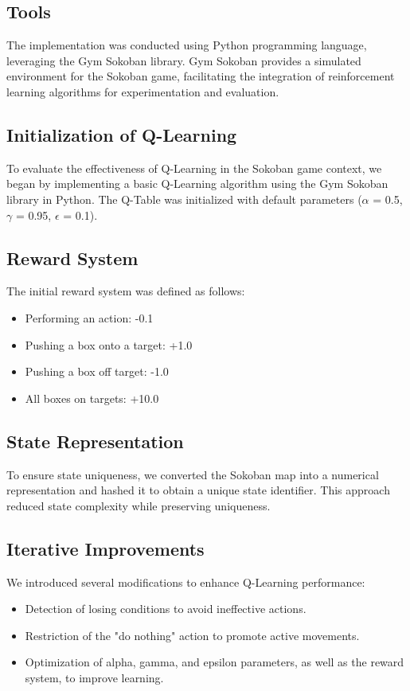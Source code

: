 \documentclass[10pt,twocolumn]{article}
\begin{document}
\subsection{Tools}

The implementation was conducted using Python programming language, leveraging the Gym Sokoban library. Gym Sokoban provides a simulated environment for the Sokoban game, facilitating the integration of reinforcement learning algorithms for experimentation and evaluation.

\subsection{Initialization of Q-Learning}

To evaluate the effectiveness of Q-Learning in the Sokoban game context, we began by implementing a basic Q-Learning algorithm using the Gym Sokoban library in Python. The Q-Table was initialized with default parameters ($\alpha$ = 0.5, $\gamma$ = 0.95, $\epsilon$ = 0.1).

\subsection{Reward System}

The initial reward system was defined as follows:
\begin{itemize}
    \item Performing an action: -0.1
    \item Pushing a box onto a target: +1.0
    \item Pushing a box off target: -1.0
    \item All boxes on targets: +10.0
\end{itemize}

\subsection{State Representation}

To ensure state uniqueness, we converted the Sokoban map into a numerical representation and hashed it to obtain a unique state identifier. This approach reduced state complexity while preserving uniqueness.

\subsection{Iterative Improvements}

We introduced several modifications to enhance Q-Learning performance:
\begin{itemize}
    \item Detection of losing conditions to avoid ineffective actions.
    \item Restriction of the "do nothing" action to promote active movements.
    \item Optimization of alpha, gamma, and epsilon parameters, as well as the reward system, to improve learning.
\end{itemize}
\end{document}

